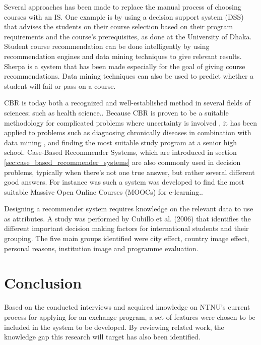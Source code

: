 Several approaches has been made to replace the manual process of choosing courses with an IS. One example is by using a decision support system (DSS) that advises the students on their course selection based on their program requirements and the course's prerequisites, as done at the University of Dhaka\cite{roushan2014university}. Student course recommendation can be done intelligently by using recommendation engines and data mining techniques to give relevant results. Sherpa\cite{bramucci2012sherpa} is a system that has been made especially for the goal of giving course recommendations. Data mining techniques can also be used to predict whether a student will fail or pass on a course\cite{vialardi2009recommendation}.

CBR is today both a recognized and well-established method in several fields of sciences; such as health science.\cite{begum2011case}. Because CBR is proven to be a suitable methodology for complicated problems where uncertainty is involved \cite{richter2013case}, it has been applied to problems such as diagnosing chronically diseases in combination with data mining \cite{huang2007integrating}, and finding the most suitable study program at a senior high school\cite{mulyana2015case}. Case-Based Recommender Systems, which are introduced in section \ref{sec:case_based_recommender_systems} are also commonly used in decision problems, typically when there's not one true answer, but rather several different good answers. For instance was such a system was developed to find the most suitable Massive Open Online Courses (MOOCs) for e-learning.\cite{bousbahi2015mooc}. 

Designing a recommender system requires knowledge on the relevant data to use as attributes. A study was performed by Cubillo et al. (2006)\cite{maria2006international} that identifies the different important decision making factors for international students and their grouping. The five main groups identified were city effect, country image effect, personal reasons, institution image and programme evaluation.    


\section{Conclusion}
Based on the conducted interviews and acquired knowledge on NTNU's current process for applying for an exchange program, a set of features were chosen to be included in the system to be developed. By reviewing related work, the knowledge gap this research will target has also been identified.

